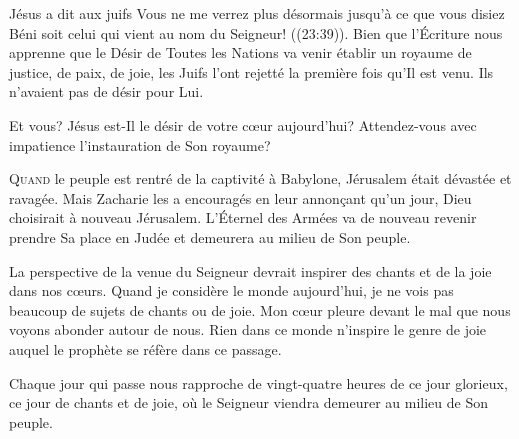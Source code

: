 Jésus a dit aux juifs\frcolon{} 
 \Og Vous ne me verrez plus désormais jusqu'à ce que vous disiez\frcolon{}
 Béni soit celui qui vient au nom du Seigneur! \Fg{} ((23:39)).
 Bien que l'Écriture nous apprenne que \Og le Désir de Toutes les Nations \Fg{}
 va venir établir un royaume de justice, de paix, de joie, les Juifs
 l'ont rejetté la première fois qu'Il est venu.
 Ils n'avaient pas de désir pour Lui. 

Et vous? Jésus est-Il le désir de votre c\oe{}ur aujourd'hui?
 Attendez-vous avec impatience l'instauration de Son royaume? 

\dvrule







\lettrine{Q}{uand} le peuple est rentré de la captivité à Babylone,
 Jérusalem était dévastée et ravagée. Mais Zacharie les a encouragés
 en leur annon\c{c}ant qu'un jour, Dieu choisirait à nouveau Jérusalem.
 L'Éternel des Armées va de nouveau revenir prendre Sa place en Judée
 et demeurera au milieu de Son peuple. 


La perspective de la venue du Seigneur devrait inspirer des chants
 et de la joie dans nos c\oe{}urs. Quand je considère le monde aujourd'hui,
 je ne vois pas beaucoup de sujets de chants ou de joie.
 Mon c\oe{}ur pleure devant le mal que nous voyons abonder autour de nous.
 Rien dans ce monde n'inspire le genre de joie auquel le prophète
 se réfère dans ce passage. 

Chaque jour qui passe nous rapproche de vingt-quatre heures de ce jour
 glorieux, ce jour de chants et de joie, où le Seigneur viendra demeurer
 au milieu de Son peuple. 

